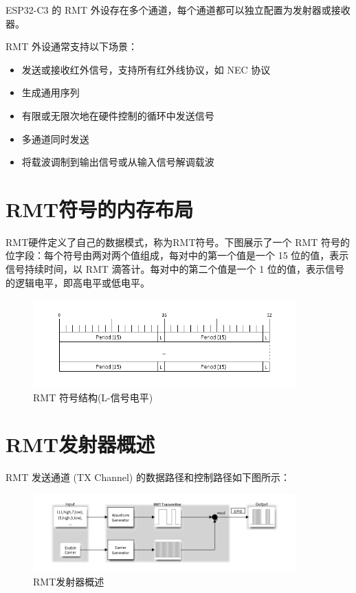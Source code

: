 \documentclass[lang=cn,newtx,10pt,scheme=chinese]{elegantbook}
\begin{document}
ESP32-C3 的 RMT 外设存在多个通道，每个通道都可以独立配置为发射器或接收器。

RMT 外设通常支持以下场景：

\begin{itemize}
\item 发送或接收红外信号，支持所有红外线协议，如 NEC 协议
\item 生成通用序列
\item 有限或无限次地在硬件控制的循环中发送信号
\item 多通道同时发送
\item 将载波调制到输出信号或从输入信号解调载波
\end{itemize}

\section{RMT符号的内存布局}

RMT硬件定义了自己的数据模式，称为RMT符号。下图展示了一个 RMT 符号的位字段：每个符号由两对两个值组成，每对中的第一个值是一个 15 位的值，表示信号持续时间，以 RMT 滴答计。每对中的第二个值是一个 1 位的值，表示信号的逻辑电平，即高电平或低电平。

\begin{figure}[!htb]
\centering
\includegraphics[width=0.9\textwidth]{RMT-1.png}
\caption{RMT 符号结构(L-信号电平)}
\end{figure}

\section{RMT发射器概述}

RMT 发送通道 (TX Channel) 的数据路径和控制路径如下图所示：

\begin{figure}[!htb]
\centering
\includegraphics[width=0.9\textwidth]{RMT-2.png}
\caption{RMT发射器概述}
\end{figure}
\end{document}

